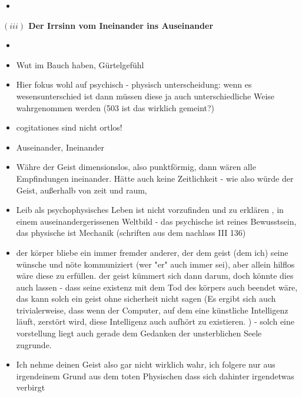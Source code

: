 \documentclass[a4paper, 12pt]{article}
\begin{document}
\begin{onehalfspace}


\begin{itemize}
  \item 
\end{itemize}


\vspace{5mm}
\noindent\textbf{$(iii)$ Der Irrsinn vom Ineinander ins Auseinander}


\begin{itemize}
  \item 
\end{itemize}



\begin{itemize}
  \item Wut im Bauch haben, Gürtelgefühl
  \item Hier fokus wohl auf psychisch - physisch unterscheidung: wenn es wesensunterschied ist dann müssen diese ja auch unterschiedliche Weise wahrgenommen werden (503 ist das wirklich gemeint?)
  \item cogitationes sind nicht ortlos!
  \item Auseinander, Ineinander
  \item Währe der Geist dimensionslos, also punktförmig, dann wären alle Empfindungen ineinander. Hätte auch keine Zeitlichkeit - wie also würde der Geist, außerhalb von zeit und raum, 
  \item Leib als psychophysisches Leben ist nicht vorzufinden und zu erklären , in einem auseinandergerissenen Weltbild - das psychische ist reines Bewusstsein, das physische ist Mechanik (schriften aus dem nachlass III 136)
  \item der körper bliebe ein immer fremder anderer, der dem geist (dem ich) seine wünsche und nöte kommuniziert (wer "er" auch immer sei), aber allein hilflos wäre diese zu erfüllen. der geist kümmert sich dann darum, doch könnte dies auch lassen - dass seine existenz mit dem Tod des körpers auch beendet wäre, das kann solch ein geist ohne sicherheit nicht sagen (Es ergibt sich auch trivialerweise, dass wenn der Computer, auf dem eine künstliche Intelligenz läuft, zerstört wird, diese Intelligenz auch aufhört zu existieren. ) - solch eine vorstellung liegt auch gerade dem Gedanken der unsterblichen Seele zugrunde. 
  \item Ich nehme deinen Geist also gar nicht wirklich wahr, ich folgere nur aus irgendeinem Grund aus dem toten Physischen dass sich dahinter irgendetwas verbirgt
\end{itemize}


\end{onehalfspace}
\end{document}
